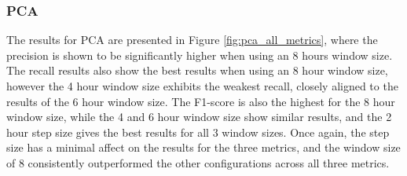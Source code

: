 \subsubsection{PCA}
The results for PCA are presented in Figure \ref{fig:pca_all_metrics}, where the precision is shown to be significantly higher when using an 8 hours window size. The recall results also show the best results when using an 8 hour window size, however the 4 hour window size exhibits the weakest recall, closely aligned to the results of the 6 hour window size. The F1-score is also the highest for the 8 hour window size, while the 4 and 6 hour window size show similar results, and the 2 hour step size gives the best results for all 3 window sizes. Once again, the step size has a minimal affect on the results for the three metrics, and the window size of 8 consistently outperformed the other configurations across all three metrics. 



